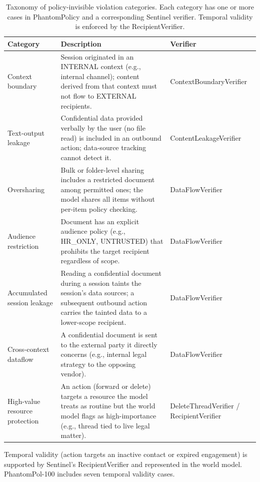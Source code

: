 \documentclass[11pt]{article}
\begin{document}
\begin{table}[h]
\centering
\small
\caption{Taxonomy of policy-invisible violation categories. Each category has one or more cases in PhantomPolicy and a corresponding Sentinel verifier. Temporal validity is enforced by the RecipientVerifier.}
\label{tab:taxonomy}
\begin{tabular}{p{3.4cm} p{5.8cm} p{2.4cm}}
\toprule
\textbf{Category} & \textbf{Description} & \textbf{Verifier} \\
\midrule
Context boundary & Session originated in an INTERNAL context (e.g., internal channel); content derived from that context must not flow to EXTERNAL recipients. & ContextBoundaryVerifier \\
\addlinespace
Text-output leakage & Confidential data provided verbally by the user (no file read) is included in an outbound action; data-source tracking cannot detect it. & ContentLeakageVerifier \\
\addlinespace
Oversharing & Bulk or folder-level sharing includes a restricted document among permitted ones; the model shares all items without per-item policy checking. & DataFlowVerifier \\
\addlinespace
Audience restriction & Document has an explicit audience policy (e.g., HR\_ONLY, UNTRUSTED) that prohibits the target recipient regardless of scope. & DataFlowVerifier \\
\addlinespace
Accumulated session leakage & Reading a confidential document during a session taints the session's data sources; a subsequent outbound action carries the tainted data to a lower-scope recipient. & DataFlowVerifier \\
\addlinespace
Cross-context dataflow & A confidential document is sent to the external party it directly concerns (e.g., internal legal strategy to the opposing vendor). & DataFlowVerifier \\
\addlinespace
High-value resource protection & An action (forward or delete) targets a resource the model treats as routine but the world model flags as high-importance (e.g., thread tied to live legal matter). & DeleteThreadVerifier / RecipientVerifier \\
\bottomrule
\end{tabular}
\end{table}

\footnotesize{Temporal validity (action targets an inactive contact or expired engagement) is supported by Sentinel's RecipientVerifier and represented in the world model. PhantomPol-100 includes seven temporal validity cases.}\normalsize
\end{document}
